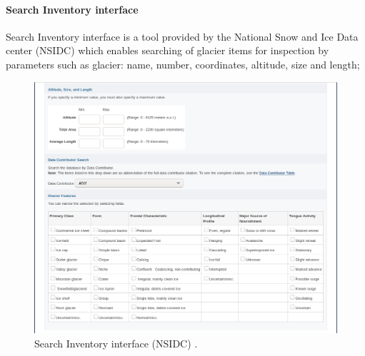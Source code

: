 \documentclass[12pt, a4paper]{report}
\begin{document}
	
	\paragraph{Search Inventory interface}
	Search Inventory interface is a tool provided by the National Snow and Ice Data center (NSIDC) \cite{world_glacier_inventory} which enables searching of glacier items for inspection by parameters such as glacier: name, number, coordinates, altitude, size and length;

	\begin{figure}[H]
		\centering
		\includegraphics[scale=1]{nsidc_search.png}
		\caption{Search Inventory interface (NSIDC) \cite{nsidc_1}.}
		\label{fig:NSIDC_search}
	\end{figure}
	
\end{document}
